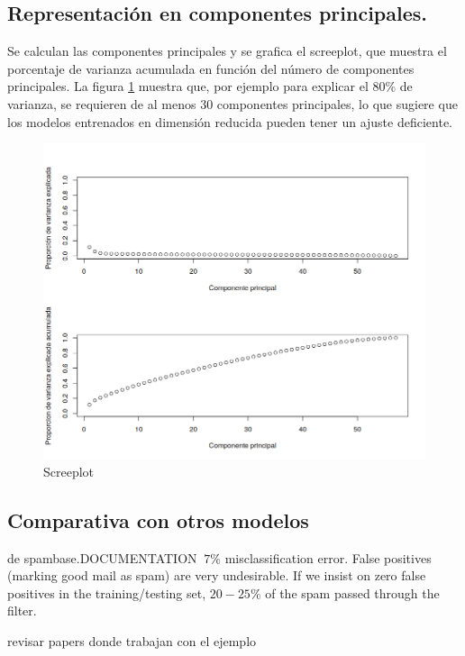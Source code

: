 \documentclass[12pt, letterpaper]{article}
\begin{document}
\subsection{Representación en componentes principales.}

Se calculan las componentes principales y se grafica el screeplot, que muestra el porcentaje de varianza acumulada en función del número de componentes principales. La figura \ref{screeplot} muestra que, por ejemplo para explicar el $80\%$ de varianza, se requieren de al menos $30$ componentes principales, 
lo que sugiere que los modelos entrenados en dimensión reducida pueden tener un ajuste deficiente.

\begin{figure}[h]
\centering
	\includegraphics[scale=.5]{images/pca.png} 
	\caption{Screeplot}
		\label{screeplot}
\end{figure}


\subsection{Comparativa con otros modelos}

de spambase.DOCUMENTATION
$~7\%$ misclassification error.
False positives (marking good mail as spam) are very undesirable.
If we insist on zero false positives in the training/testing set,
$20-25\%$ of the spam passed through the filter.

revisar papers donde trabajan con el ejemplo
\end{document}

